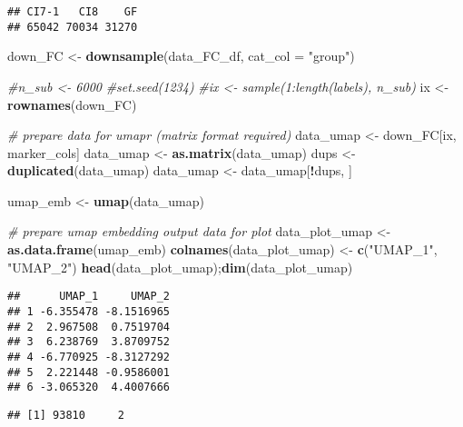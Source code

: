 \documentclass[
]{article}
\newenvironment{Shaded}{\begin{snugshade}}{\end{snugshade}}
\newcommand{\AttributeTok}[1]{\textcolor[rgb]{0.13,0.29,0.53}{#1}}
\newcommand{\CommentTok}[1]{\textcolor[rgb]{0.56,0.35,0.01}{\textit{#1}}}
\newcommand{\FunctionTok}[1]{\textcolor[rgb]{0.13,0.29,0.53}{\textbf{#1}}}
\newcommand{\NormalTok}[1]{#1}
\newcommand{\OtherTok}[1]{\textcolor[rgb]{0.56,0.35,0.01}{#1}}
\newcommand{\SpecialCharTok}[1]{\textcolor[rgb]{0.81,0.36,0.00}{\textbf{#1}}}
\newcommand{\StringTok}[1]{\textcolor[rgb]{0.31,0.60,0.02}{#1}}
\begin{document}
\begin{verbatim}
## CI7-1   CI8    GF 
## 65042 70034 31270
\end{verbatim}

\begin{Shaded}
\begin{Highlighting}[]
\NormalTok{down\_FC }\OtherTok{\textless{}{-}} \FunctionTok{downsample}\NormalTok{(data\_FC\_df, }\AttributeTok{cat\_col =} \StringTok{"group"}\NormalTok{)}

\CommentTok{\#n\_sub \textless{}{-} 6000}
\CommentTok{\#set.seed(1234)}
\CommentTok{\#ix \textless{}{-} sample(1:length(labels), n\_sub)}
\NormalTok{ix }\OtherTok{\textless{}{-}} \FunctionTok{rownames}\NormalTok{(down\_FC)}

\CommentTok{\# prepare data for umapr (matrix format required)}
\NormalTok{data\_umap }\OtherTok{\textless{}{-}}\NormalTok{ down\_FC[ix, marker\_cols]}
\NormalTok{data\_umap }\OtherTok{\textless{}{-}} \FunctionTok{as.matrix}\NormalTok{(data\_umap)}
\NormalTok{dups }\OtherTok{\textless{}{-}} \FunctionTok{duplicated}\NormalTok{(data\_umap)}
\NormalTok{data\_umap }\OtherTok{\textless{}{-}}\NormalTok{ data\_umap[}\SpecialCharTok{!}\NormalTok{dups, ]}

\NormalTok{umap\_emb }\OtherTok{\textless{}{-}} \FunctionTok{umap}\NormalTok{(data\_umap)}

\CommentTok{\# prepare umap embedding output data for plot}
\NormalTok{data\_plot\_umap }\OtherTok{\textless{}{-}} \FunctionTok{as.data.frame}\NormalTok{(umap\_emb)}
\FunctionTok{colnames}\NormalTok{(data\_plot\_umap) }\OtherTok{\textless{}{-}} \FunctionTok{c}\NormalTok{(}\StringTok{"UMAP\_1"}\NormalTok{, }\StringTok{"UMAP\_2"}\NormalTok{)}
\FunctionTok{head}\NormalTok{(data\_plot\_umap);}\FunctionTok{dim}\NormalTok{(data\_plot\_umap)}
\end{Highlighting}
\end{Shaded}

\begin{verbatim}
##      UMAP_1     UMAP_2
## 1 -6.355478 -8.1516965
## 2  2.967508  0.7519704
## 3  6.238769  3.8709752
## 4 -6.770925 -8.3127292
## 5  2.221448 -0.9586001
## 6 -3.065320  4.4007666
\end{verbatim}

\begin{verbatim}
## [1] 93810     2
\end{verbatim}
\end{document}
